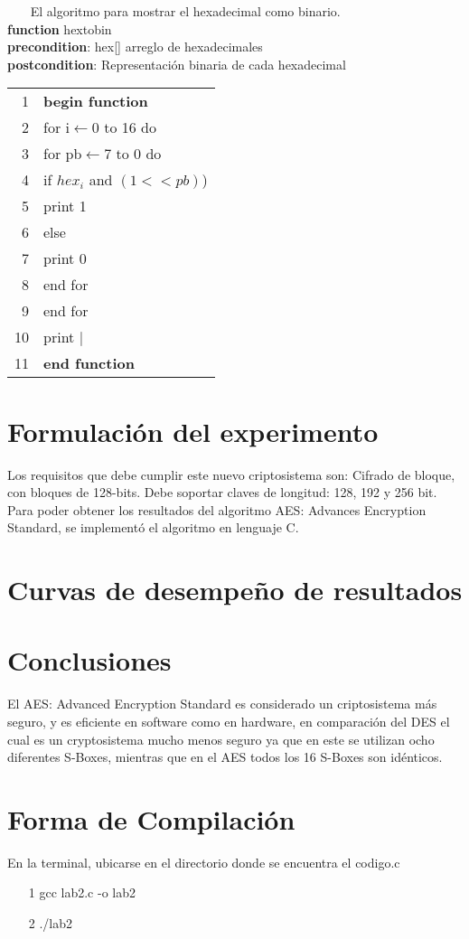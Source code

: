 \documentclass{report}
\newcommand \minitab{\hspace*{15 pt}}
\begin{document}
~~~
\newpage
\noindent El algoritmo para mostrar el hexadecimal como binario.\\
\newline
{\bf function} hextobin\\
{\bf precondition}: hex[] arreglo de hexadecimales\\
{\bf postcondition}: Representaci\'on binaria de cada hexadecimal\\
\newline
\newline
\begin{tabular}{r l}
\\
1 & \bf{begin function} \\
2 & \minitab for i$\leftarrow$0 to 16 do\\
3 & \minitab \minitab for pb$\leftarrow$7 to 0 do\\
4 & \minitab \minitab \minitab if $hex_i$ and $(1<<pb)$)\\
5 & \minitab \minitab \minitab \minitab print 1\\
6 & \minitab \minitab \minitab else\\
7 & \minitab \minitab \minitab \minitab print 0\\
8 & \minitab \minitab end for\\
9 & \minitab end for\\
10 & \minitab print $|$\\
11 & \bf end function\\
\end{tabular}
\newline
%
\section{Formulaci\'on del experimento}
Los requisitos que debe cumplir este nuevo criptosistema son: Cifrado de bloque, con bloques de 128-bits. Debe soportar claves de longitud: 128, 192 y 256 bit.\\
\newline
Para poder obtener los resultados del algoritmo AES: Advances Encryption Standard, se implement\'o el algoritmo en lenguaje C.
%
\section{Curvas de desempe\~no de resultados}
\begin{center}
\end{center}
%
\section{Conclusiones}
El AES: Advanced Encryption Standard es considerado un criptosistema m\'as seguro, y es eficiente en software como en hardware, en comparaci\'on del DES el cual es un cryptosistema mucho menos seguro ya que en este se utilizan ocho diferentes S-Boxes, mientras que en el AES todos los 16 S-Boxes son id\'enticos.
%
\section{Forma de Compilaci\'on}
En la terminal, ubicarse en el directorio donde se encuentra el codigo.c
\begin{itemize}
\item[1] gcc lab2.c -o lab2
\item[2] ./lab2
\end{itemize}
%
\end{document}
